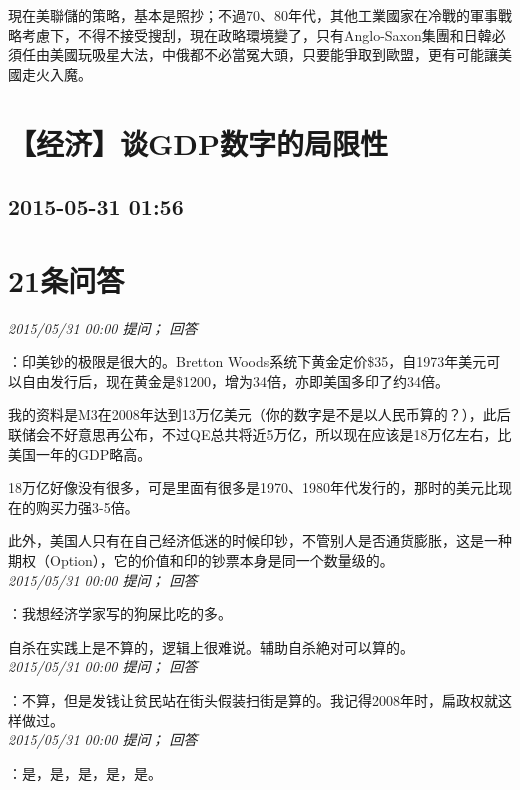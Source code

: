 \documentclass[twocolumn]{ctexart}
\begin{document}
現在美聯儲的策略，基本是照抄；不過70、80年代，其他工業國家在冷戰的軍事戰略考慮下，不得不接受搜刮，現在政略環境變了，只有Anglo-Saxon集團和日韓必須任由美國玩吸星大法，中俄都不必當冤大頭，只要能爭取到歐盟，更有可能讓美國走火入魔。
\\


\section{【经济】谈GDP数字的局限性 }
\subsection{2015-05-31 01:56}


\section{21条问答}

\textit{\hfill\noindent\small 2015/05/31 00:00 提问； 回答}

：印美钞的极限是很大的。Bretton Woods系统下黄金定价\$35，自1973年美元可以自由发行后，现在黄金是\$1200，增为34倍，亦即美国多印了约34倍。

我的资料是M3在2008年达到13万亿美元（你的数字是不是以人民币算的？），此后联储会不好意思再公布，不过QE总共将近5万亿，所以现在应该是18万亿左右，比美国一年的GDP略高。

18万亿好像没有很多，可是里面有很多是1970、1980年代发行的，那时的美元比现在的购买力强3-5倍。

此外，美国人只有在自己经济低迷的时候印钞，不管别人是否通货膨胀，这是一种期权（Option），它的价值和印的钞票本身是同一个数量级的。\\

\textit{\hfill\noindent\small 2015/05/31 00:00 提问； 回答}

：我想经济学家写的狗屎比吃的多。

自杀在实践上是不算的，逻辑上很难说。辅助自杀絶对可以算的。\\

\textit{\hfill\noindent\small 2015/05/31 00:00 提问； 回答}

：不算，但是发钱让贫民站在街头假装扫街是算的。我记得2008年时，扁政权就这样做过。\\

\textit{\hfill\noindent\small 2015/05/31 00:00 提问； 回答}

：是，是，是，是，是。
\end{document}
